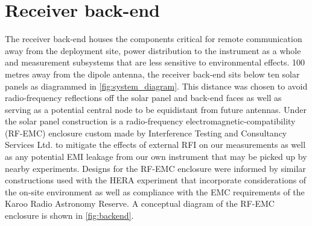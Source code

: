 \section{Receiver back-end}\label{sec:backend}
The receiver back-end houses the components critical for remote communication away from the deployment site, power distribution to the instrument as a whole and measurement subsystems that are less sensitive to environmental effects. 100 metres away from the dipole antenna, the receiver back-end sits below ten solar panels as diagrammed in \cref{fig:system_diagram}. This distance was chosen to avoid radio-frequency reflections off the solar panel and back-end faces as well as serving as a potential central node to be equidistant from future antennas. Under the solar panel construction is a radio-frequency electromagnetic-compatibility (RF-EMC) enclosure custom made by Interference Testing and Consultancy Services Ltd. to mitigate the effects of external RFI on our measurements as well as any potential EMI leakage from our own instrument that may be picked up by nearby experiments. Designs for the RF-EMC enclosure were informed by similar constructions used with the HERA experiment that incorporate considerations of the on-site environment as well as compliance with the EMC requirements of the Karoo Radio Astronomy Reserve. A conceptual diagram of the RF-EMC enclosure is shown in \cref{fig:backend}.
